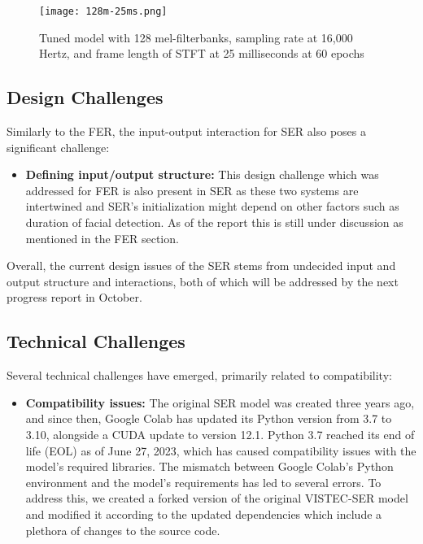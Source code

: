\begin{figure}[ht]
    \centering
    \captionsetup{justification=centering}
    \texttt{[image: 128m-25ms.png]}
    \caption{Tuned model with 128 mel-filterbanks, sampling rate at 16,000 Hertz, and frame length of STFT at 25 milliseconds at 60 epochs}
    \label{fig:128m-25ms}
\end{figure}

\subsection{Design Challenges}
Similarly to the FER, the input-output interaction for SER also poses a significant challenge:
\begin{itemize}
    \item \textbf{Defining input/output structure:} This design challenge which was addressed for FER is also present in SER as these two systems are intertwined and SER’s initialization might depend on other factors such as duration of facial detection. As of the report this is still under discussion as mentioned in the FER section.
\end{itemize}
    
    Overall, the current design issues of the SER stems from undecided input and output structure and interactions, both of which will be addressed by the next progress report in October.

\subsection{Technical Challenges}
Several technical challenges have emerged, primarily related to compatibility:
\begin{itemize}
    \item \textbf{Compatibility issues:} The original SER model was created three years ago, and since then, Google Colab has updated its Python version from 3.7 to 3.10, alongside a CUDA update to version 12.1. Python 3.7 reached its end of life (EOL) as of June 27, 2023, which has caused compatibility issues with the model's required libraries. The mismatch between Google Colab’s Python environment and the model’s requirements has led to several errors. To address this, we created a forked version of the original VISTEC-SER model and modified it according to the updated dependencies which include a plethora of changes to the source code.
\end{itemize}